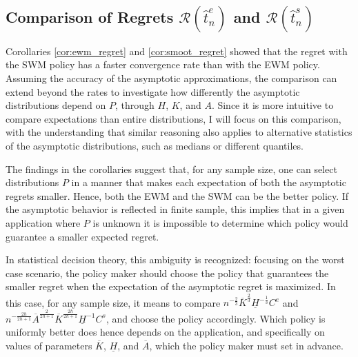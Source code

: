 {\subsection{Comparison of Regrets $\mathcal{R}(\hat{t}^e_n)$ and $\mathcal{R}(\hat{t}^s_n)$} \label{sec:comp}

Corollaries \ref{cor:ewm_regret} and \ref{cor:smoot_regret} showed that the regret with the SWM policy has a faster convergence rate than with the EWM policy. Assuming the accuracy of the asymptotic approximations, the comparison can extend beyond the rates to investigate how differently the asymptotic distributions depend on $P$, through $H$, $K$, and $A$. Since it is more intuitive to compare expectations than entire distributions, I will focus on this comparison, with the understanding that similar reasoning also applies to alternative statistics of the asymptotic distributions, such as medians or different quantiles.

The findings in the corollaries suggest that, for any sample size, one can select distributions $P$ in a manner that makes each expectation of both the asymptotic regrets smaller. Hence, both the EWM and the SWM can be the better policy. If the asymptotic behavior is reflected in finite sample, this implies that in a given application where $P$ is unknown it is impossible to determine which policy would guarantee a smaller expected regret.

In statistical decision theory, this ambiguity is recognized: focusing on the worst case scenario, the policy maker should choose the policy that guarantees the smaller regret when the expectation of the asymptotic regret is maximized. In this case, for any sample size, it means to compare $n^{-\frac{2}{3}} \overline{K}^\frac{2}{3} \underline{H}^{-\frac{1}{3}} C^e$ and $n^{-\frac{2h}{2h + 1}} \overline{A}^{\frac{2}{2h+1}} \overline{K}^{\frac{2h}{2h+1}} \underline{H}^{-1} C^s$, and choose the policy accordingly. Which policy is uniformly better does hence depends on the application, and specifically on values of parameters $\overline{K}$, $\underline{H}$, and $\overline{A}$, which the policy maker must set in advance.

}
